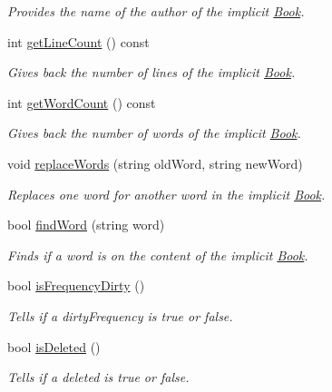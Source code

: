 \begin{DoxyCompactItemize}
\begin{DoxyCompactList}\small\item\em Provides the name of the author of the implicit \hyperlink{class_book}{Book}. \end{DoxyCompactList}\item 
int \hyperlink{class_book_abd9ca114f4909a735c7cb017920b30e4}{get\+Line\+Count} () const 
\begin{DoxyCompactList}\small\item\em Gives back the number of lines of the implicit \hyperlink{class_book}{Book}. \end{DoxyCompactList}\item 
int \hyperlink{class_book_a32d34e718a05a927ab0aa17bfa9baead}{get\+Word\+Count} () const 
\begin{DoxyCompactList}\small\item\em Gives back the number of words of the implicit \hyperlink{class_book}{Book}. \end{DoxyCompactList}\item 
void \hyperlink{class_book_aaf182e24b86624b6ff54fba2581094a4}{replace\+Words} (string old\+Word, string new\+Word)
\begin{DoxyCompactList}\small\item\em Replaces one word for another word in the implicit \hyperlink{class_book}{Book}. \end{DoxyCompactList}\item 
bool \hyperlink{class_book_af3ceb5ae5d66adf4d594cac8d29294fc}{find\+Word} (string word)
\begin{DoxyCompactList}\small\item\em Finds if a word is on the content of the implicit \hyperlink{class_book}{Book}. \end{DoxyCompactList}\item 
bool \hyperlink{class_book_aec01aa24087b313f36cc0fe3c4664f84}{is\+Frequency\+Dirty} ()
\begin{DoxyCompactList}\small\item\em Tells if a dirty\+Frequency is true or false. \end{DoxyCompactList}\item 
bool \hyperlink{class_book_ae39b44d3e5b6f65947776735d49d1d0f}{is\+Deleted} ()
\begin{DoxyCompactList}\small\item\em Tells if a deleted is true or false. \end{DoxyCompactList}\item 

\end{DoxyCompactItemize}
